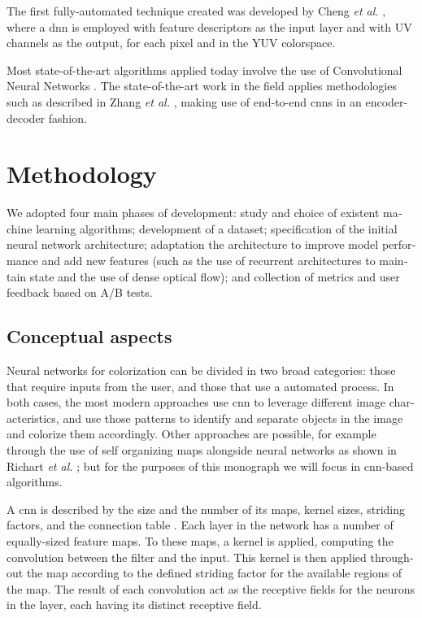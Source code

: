 \documentclass[12pt,openright,oneside,a4paper,english]{abntex2}
\begin{document}
\begin{otherlanguage}{english}
    The first fully-automated technique created was developed by Cheng \textit{et al.} \cite{Cheng2015},
    where a \acrfull{dnn} is employed with feature descriptors as the input layer and with UV channels as the output, for each pixel and in the YUV colorspace.

    Most state-of-the-art algorithms applied today involve the use of Convolutional Neural Networks \cite{Larsson2016} \cite{Iizuka2016}. The state-of-the-art work in the field applies methodologies such as described in Zhang \textit{et al.} \cite{colorful}, making use of end-to-end \acrshort{cnn}s in an encoder-decoder fashion.


    \chapter{Methodology}

    We adopted four main phases of development: study and choice of existent machine learning algorithms; development of a dataset; specification of the initial neural network architecture; adaptation the architecture to improve model performance and add new features (such as the use of recurrent architectures to maintain state and the use of dense optical flow); and collection of metrics and user feedback based on A/B tests.

    \section{Conceptual aspects} \label{sec:Concept}
    Neural networks for colorization can be divided in two broad categories: those that require inputs from the user, and those that use a automated process. In both cases, the most modern approaches use \acrshort{cnn} to leverage different image characteristics, and use those patterns to identify and separate objects in the image and colorize them accordingly. Other approaches are possible, for example through the use of self organizing maps alongside neural networks as shown in Richart \textit{et al.} \cite{Richart_som_nn}; but for the purposes of this monograph we will focus in \acrshort{cnn}-based algorithms.

    A \acrshort{cnn} is described by the size and the number of its maps, kernel sizes, striding factors, and the connection table \cite{Ciresan2011}. Each layer in the network has a number of equally-sized feature maps. To these maps, a kernel is applied, computing the convolution between the filter and the input. This kernel is then applied throughout the map according to the defined striding factor for the available regions of the map. The result of each convolution act as the receptive fields for the neurons in the layer, each having its distinct receptive field.


\end{otherlanguage}
\end{document}
